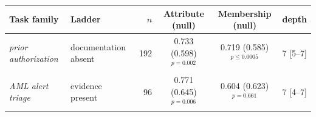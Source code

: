 {\setlength{\tabcolsep}{4pt}\renewcommand{\arraystretch}{1.15}
\begin{tabular}{@{}llrccc@{}}
\toprule
Task family & Ladder & $n$ & Attribute (null) & Membership (null) & depth \\
\midrule
\emph{prior authorization} & documentation absent & 192 & 0.733 (0.598)$^{p=0.002}$ & 0.719 (0.585)$^{p\le 0.0005}$ & 7 [5--7] \\
\emph{AML alert triage} & evidence present & 96 & 0.771 (0.645)$^{p=0.006}$ & 0.604 (0.623)$^{p=0.661}$ & 7 [4--7] \\
\bottomrule
\end{tabular}}

